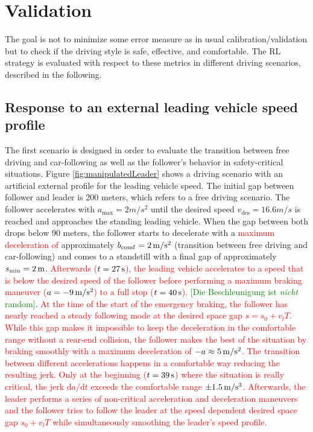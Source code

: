 \documentclass[review]{elsarticle}
\providecommand{\red}[1]{\textcolor{red}{#1}}
\providecommand{\green}[1]{\textcolor{green}{#1}}
\providecommand{\martin}[1]{\red{#1}} %
\providecommand{\martinc}[1]{\green{[#1]}} %
\providecommand{\sub}[1]{_{\mathrm{#1}}}  %
\providecommand{\3}{{\ss}}
\begin{document}
\section{Validation}

The goal is not to minimize some error measure as in usual
calibration/validation but to check if the driving style is safe,
effective, and comfortable. The RL strategy is evaluated with respect to these metrics in different driving scenarios, described in the following.

\subsection{Response to an external leading vehicle speed profile}
The first scenario is designed in order to evaluate the transition between free driving and car-following as well as the follower's behavior in safety-critical situations. 
Figure \ref{fig:manipulatedLeader} shows a driving scenario with an
artificial external profile for the leading vehicle speed. The initial
gap between 
follower and leader is 200 meters, which refers to a free driving
scenario. The follower accelerates with $a\sub{max} = 2m/s^2$ until
the desired speed $v\sub{des} = 16.6m/s$ is reached and approaches
the standing leading vehicle. When the gap between both drops below 90
meters, the follower starts to decelerate with a \martin{maximum
  deceleration of} approximately $b_{\rm
  comf} = \unit[2]{m/s^2}$ (transition between free driving and car-following)
and comes to a standstill with a final gap of approximately 
$s\sub{min} = \unit[2]{m}$. \martin{Afterwards ($t=\unit[27]{s}$),  the leading vehicle accelerates to a speed
that is below the desired speed of the follower before performing a
maximum braking maneuver ($a=\unit[-9]{m/s^2}$) to a full stop ($t=\unit[40]{s}$).} \martinc{Die Beschleunigung
  ist \emph{nicht} random}. \martin{At the time of the start of the
  emergency braking, the follower has nearly reached a steady
  following mode at the desired space gap $s=s_0+v_l T$. While this
  gap makes it impossible to keep the deceleration in the comfortable
  range without a rear-end collision, the follower makes the best of
  the situation by braking smoothly with a maximum deceleration of $-a
  \approx \unit[5]{m/s^2}$.  The transition between different
accelerations happens in a comfortable way reducing the resulting
jerk. Only at the beginning ($t=\unit[39]{s}$) where the situation is
really critical, the jerk $\text{d}a/\text{d}t$ exceeds the comfortable range 
$\pm \unit[1.5]{m/s^3}$. Afterwards, the leader performs a series of
non-critical acceleration and deceleration maneuvers and the follower
tries to follow the leader at the speed dependent desired space gap
$s_0+v_lT$ while 
simultaneously smoothing the leader's speed profile.} 
\end{document}
